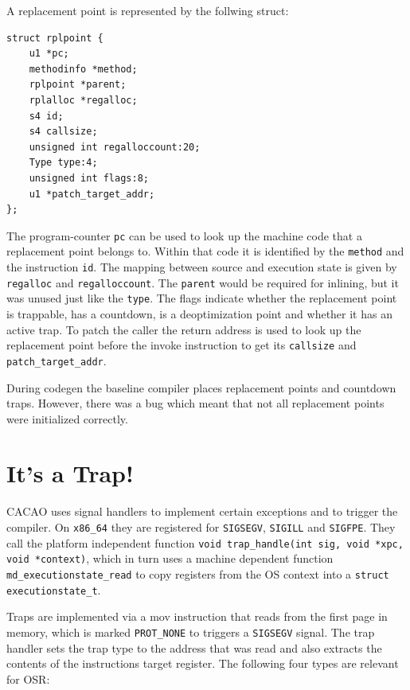 \documentclass[draft,final]{vutinfth} %
\begin{document}
    A replacement point is represented by the follwing struct:
    \begin{lstlisting}
struct rplpoint {
    u1 *pc;
    methodinfo *method;
    rplpoint *parent;
    rplalloc *regalloc;
    s4 id;
    s4 callsize;
    unsigned int regalloccount:20;
    Type type:4;
    unsigned int flags:8;
    u1 *patch_target_addr;
};
    \end{lstlisting}
    The program-counter \lstinline{pc} can be used to look up the machine code that a replacement point belongs to.
    Within that code it is identified by the \lstinline{method} and the instruction \lstinline{id}.
    The mapping between source and execution state is given by \lstinline{regalloc} and \lstinline{regalloccount}.
    The \lstinline{parent} would be required for inlining, but it was unused just like the \lstinline{type}.
    The flags indicate whether the replacement point is trappable, has a countdown, is a deoptimization point and whether it has an active trap.
    To patch the caller the return address is used to look up the replacement point before the invoke instruction
    to get its \lstinline{callsize} and \lstinline{patch_target_addr}.

    During codegen the baseline compiler places replacement points and countdown traps.
    However, there was a bug which meant that not all replacement points were initialized correctly.


    \section{It's a Trap!}

    CACAO uses signal handlers to implement certain exceptions and to trigger the compiler.
    On \texttt{x86\_64} they are registered for \lstinline{SIGSEGV}, \lstinline{SIGILL} and \lstinline{SIGFPE}.
    They call the platform independent function \lstinline{void trap_handle(int sig, void *xpc, void *context)},
    which in turn uses a machine dependent function \lstinline{md_executionstate_read} to
    copy registers from the OS context into a \lstinline{struct executionstate_t}.

    Traps are implemented via a mov instruction that reads from the first page in memory,
    which is marked \lstinline{PROT_NONE} to triggers a \lstinline{SIGSEGV} signal.
    The trap handler sets the trap type to the address that was read and also extracts the contents of the instructions target register.
    The following four types are relevant for OSR:
\end{document}
